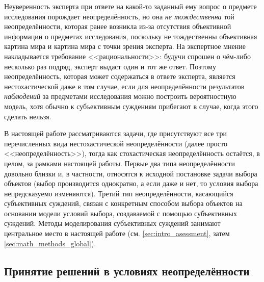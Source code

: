 Неуверенность эксперта при ответе на какой-то заданный ему вопрос о предмете исследования порождает неопределённость, но она {\sl не тождественна} той неопределённости, которая ранее возникла из-за отсутствия объективной информации о предметах исследования, поскольку не тождественны объективная картина мира и картина мира с точки зрения эксперта. На экспертное мнение накладывается требование <<рациональности>>: будучи спрошен о чём-либо несколько раз подряд, эксперт выдаст один и тот же ответ. Поэтому неопределённость, которая может содержаться в ответе эксперта, является нестохастической даже в том случае, если для неопределённости результатов {\sl наблюдений} за предметами исследования можно построить вероятностную модель, хотя обычно к субъективным суждениям прибегают в случае, когда этого сделать нельзя. 

В настоящей работе рассматриваются задачи, где присутствуют все три перечисленных вида нестохастической неопределённости (далее просто <<неопределённость>>), тогда как стохастическая неопределённость остаётся, в целом, за рамками настоящей работы. Первые два типа неопределённости довольно близки и, в частности, относятся к исходной постановке задачи выбора объектов (выбор производится однократно, а если даже и нет, то условия выбора непредсказуемо изменяются). Третий тип неопределённости, касающийся субъективных суждений, связан с конкретным способом выбора объектов на основании модели условий выбора, создаваемой с помощью субъективных суждений. Методы моделирования субъективных суждений занимают центральное место в настоящей работе (см. \ref{sec:intro_asessment}, затем \ref{sec:math_methods_global}).  

\subsection{Принятие решений в условиях неопределённости}

